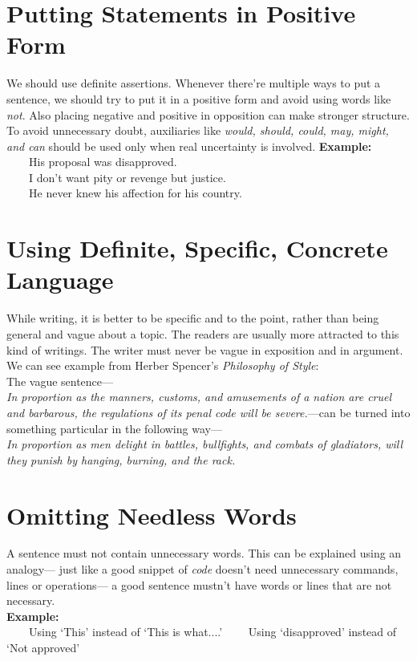 \documentclass[12pt]{report}
\newcommand{\xmpl}{\textbf{Example:}\\} %
\newcommand{\indnt}{\ \ \ \ } %
\begin{document}
\section{Putting Statements in Positive Form}
We should use definite assertions. Whenever there're multiple ways to put a sentence, we should try to put it in a positive form and avoid using words like \emph{not}. Also placing negative and positive in opposition can make stronger structure. To avoid unnecessary doubt, auxiliaries like \emph{would, should, could, may, might, \emph{and} can} should be used only when real uncertainty is involved.
\xmpl
\indnt His proposal was disapproved.\\
\indnt I don't want pity or revenge but justice.\\
\indnt He never knew his affection for his country.\\
\section{Using Definite, Specific, Concrete Language}
While writing, it is better to be specific and to the point, rather than being general and vague about a topic. The readers are usually more attracted to this kind of writings. The writer must never be vague in exposition and in argument. We can see example from Herber Spencer's \textit{Philosophy of Style}:\\
The vague sentence---\\ \textit{In proportion as the manners, customs, and amusements of a nation are cruel and barbarous, the regulations of its penal code will be severe.}---can be turned into something particular in the following way---\\
\textit{In proportion as men delight in battles, bullfights, and combats of gladiators, will they punish by hanging, burning, and the rack.}\\
\section{Omitting Needless Words}
A sentence must not contain unnecessary words. This can be explained using an analogy--- just like a good snippet of \textit{code} doesn't need unnecessary commands, lines or operations--- a good sentence mustn't have words or lines that are not necessary.\\
\xmpl
\indnt Using `This' instead of `This is what....'
\indnt Using `disapproved' instead of `Not approved'\\
\end{document}
